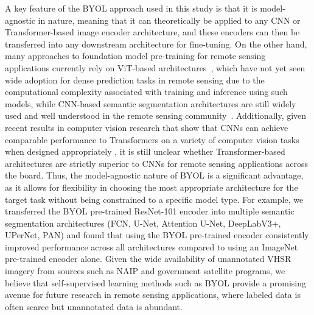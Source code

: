 A key feature of the BYOL approach used in this study is that it is model-agnostic in nature, meaning that it can theoretically be applied to any CNN or Transformer-based image encoder architecture, and these encoders can then be transferred into any downstream architecture for fine-tuning.
On the other hand, many approaches to foundation model pre-training for remote sensing applications currently rely on ViT-based architectures~\citep{liPredictingGradientBetter2024, yaoRingMoSenseRemoteSensing2023, dumeurSelfSupervisedSpatioTemporalRepresentation2024}, which have not yet seen wide adoption for dense prediction tasks in remote sensing due to the computational complexity associated with training and inference using such models, while CNN-based semantic segmentation architectures are still widely used and well understood in the remote sensing community~\citep{xuVisionTransformerExcellent2022, zhuChangeViTUnleashingPlain2026}.
Additionally, given recent results in computer vision research that show that CNNs can achieve comparable performance to Transformers on a variety of computer vision tasks when designed appropriately \citep{liuConvNet2020s2022, wooConvNeXtV2CoDesigning2023}, it is still unclear whether Transformer-based architectures are strictly superior to CNNs for remote sensing applications across the board.
Thus, the model-agnostic nature of BYOL is a significant advantage, as it allows for flexibility in choosing the most appropriate architecture for the target task without being constrained to a specific model type.
For example, we transferred the BYOL pre-trained ResNet-101 encoder into multiple semantic segmentation architectures (FCN, U-Net, Attention U-Net, DeepLabV3+, UPerNet, PAN) and found that using the BYOL pre-trained encoder consistently improved performance across all architectures compared to using an ImageNet pre-trained encoder alone.
Given the wide availability of unannotated VHSR imagery from sources such as NAIP and government satellite programs, we believe that self-supervised learning methods such as BYOL provide a promising avenue for future research in remote sensing applications, where labeled data is often scarce but unannotated data is abundant.

